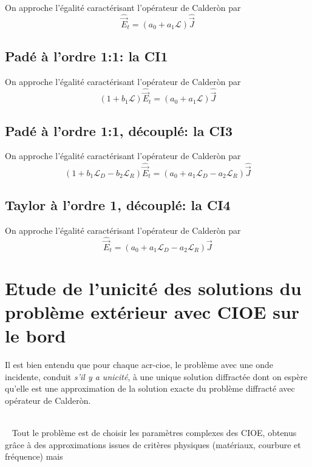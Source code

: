 \documentclass[12pt,%
    twoside,%
    a4paper,%
    openright, %
    ]{book}
\numberwithin{equation}{section} %
\newcommand{\vect}[1]{{\overset{\rightarrow}{#1}}}
\newcommand{\LD}{{\mathcal{L}_D}}
\newcommand{\LL}{\mathcal{L}}
\newcommand{\LR}{{\mathcal{L}_R}}
\newcommand{\vE}{\vect{E}}
\newcommand{\vJ}{\vect{J}}
\begin{document}
    On approche l'égalité caractérisant l'opérateur de Calderòn par
    \[
      \hat\vE_t = ( a_0 + a_1 \LL ) \hat \vJ
    \]

  \subsection{Padé à l'ordre 1:1: la CI1}

    On approche l'égalité caractérisant l'opérateur de Calderòn par
    \[
      ( 1 + b_1 \LL )\hat\vE_t = ( a_0 + a_1 \LL ) \hat \vJ
    \]

  \subsection{Padé à l'ordre 1:1, découplé: la CI3}

    On approche l'égalité caractérisant l'opérateur de Calderòn par
    \[
      ( 1 + b_1 \LD -b_2 \LR )\hat\vE_t = ( a_0 + a_1 \LD -a_2 \LR) \hat \vJ
    \]

  \subsection{Taylor à l'ordre 1, découplé: la CI4}

    On approche l'égalité caractérisant l'opérateur de Calderòn par
    \[
      \hat\vE_t = ( a_0 + a_1 \LD - a_2 \LR ) \hat \vJ
    \]

\section{Etude de l'unicité des solutions du problème extérieur avec CIOE sur le bord}

  Il est bien entendu que pour chaque \gls{acr-cioe}, le problème avec une onde incidente, conduit \emph{s'il y a unicité}, à une unique solution diffractée dont on espère qu'elle est une approximation de la solution exacte du problème diffracté avec opérateur de Calderòn.

  {~}\\{~}
  Tout le problème est de choisir les paramètres complexes des CIOE, obtenus grâce à des approximations issues de critères physiques (matériaux, courbure et fréquence) mais %

\end{document}
